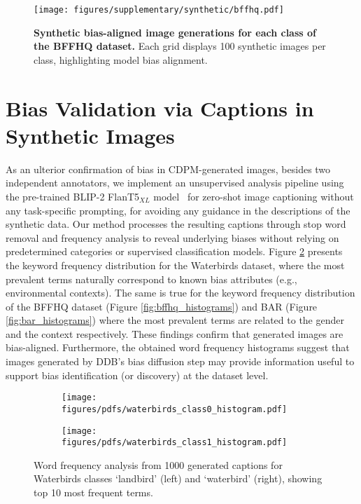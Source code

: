 \begin{figure}[ht]
    \centering
    \texttt{[image: figures/supplementary/synthetic/bffhq.pdf]}
    \caption{\textbf{Synthetic bias-aligned image generations for each class of the BFFHQ dataset.} Each grid displays 100 synthetic images per class, highlighting model bias alignment.}
    \label{fig:bffhq}
\end{figure}


\section{Bias Validation via Captions in Synthetic Images}
\label{supsec:bias_naming}
As an ulterior confirmation of bias in CDPM-generated images, besides two independent annotators, we implement an unsupervised analysis pipeline using the pre-trained BLIP-2 FlanT5$_{XL}$ model~\cite{DBLP:conf/icml/0008LSH23} for zero-shot image captioning without any task-specific prompting, for avoiding any guidance in the descriptions of the synthetic data. Our method processes the resulting captions through stop word removal and frequency analysis to reveal underlying biases without relying on predetermined categories or supervised classification models. Figure \ref{fig:waterbirds_histograms} presents the keyword frequency distribution for the Waterbirds dataset, where the most prevalent terms naturally correspond to known bias attributes (e.g., environmental contexts). The same is true for the keyword frequency distribution of the BFFHQ dataset (Figure \ref{fig:bffhq_histograms}) and BAR (Figure \ref{fig:bar_histograms}) where the most prevalent terms are related to the gender and the context respectively.
These findings confirm that generated images are bias-aligned. Furthermore, the obtained word frequency histograms suggest that images generated by DDB's bias diffusion step may provide information useful to support bias identification (or discovery) at the dataset level. 



\begin{figure}[htbp]
    \centering
    \begin{subfigure}[b]{0.45\columnwidth}
        \centering
        \texttt{[image: figures/pdfs/waterbirds\_class0\_histogram.pdf]}
    \end{subfigure}
    \hfill
    \begin{subfigure}[b]{0.45\columnwidth}
        \centering
        \texttt{[image: figures/pdfs/waterbirds\_class1\_histogram.pdf]}
    \end{subfigure}
    \caption{Word frequency analysis from 1000 generated captions for Waterbirds classes `landbird' (left) and `waterbird' (right), showing top 10 most frequent terms.}
    \label{fig:waterbirds_histograms}
\end{figure}




